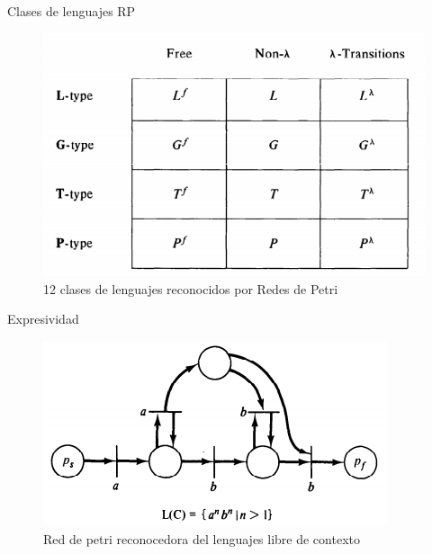 \documentclass[
compress,
xcolor=table,
dvipsnames,
]{beamer}
\begin{document}

\begin{frame}{Clases de lenguajes RP}
    \begin{figure}[h]
        \includegraphics[scale=0.45]{graphics/rp_languages.png}
        \caption{12 clases de lenguajes reconocidos por Redes de Petri \citep{Peterson:81}}
    \end{figure}
\end{frame}


\begin{frame}{Expresividad}
    \begin{figure}[h]
        \includegraphics[scale=0.7]{graphics/rp_context_free.png}
        \caption{Red de petri reconocedora del lenguajes libre de contexto \citep{Peterson:81}}
    \end{figure}
\end{frame}

\end{document}
